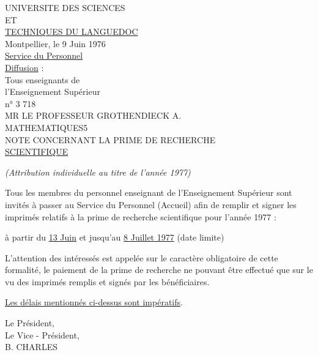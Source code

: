 UNIVERSITE DES SCIENCES\\
ET\\
\uline{TECHNIQUES DU LANGUEDOC}\\

Montpellier, le 9 Juin 1976\\

\uline{Service du Personnel}\\
\uline{Diffusion} :\\
Tous enseignants de\\
l'Enseignement Supérieur\\
n° 3 718\\

MR LE PROFESSEUR GROTHENDIECK A.\\
MATHEMATIQUES\hfill 5\\

NOTE CONCERNANT LA PRIME DE RECHERCHE\\
\uline{SCIENTIFIQUE}

\textit{(Attribution individuelle au titre de l'année 1977)}

Tous les membres du personnel enseignant de l'Enseignement Supérieur sont invités à passer au Service du Personnel (Accueil) afin de remplir et signer les imprimés relatifs à la prime de recherche scientifique pour l'année 1977 :

à partir du \uline{13 Juin} et jusqu'au \uline{8 Juillet 1977} (date limite)

L'attention des intéressés est appelée sur le caractère obligatoire de cette formalité, le paiement de la prime de recherche ne pouvant être effectué que sur le vu des imprimés remplis et signés par les bénéficiaires.

\uline{Les délais mentionnés ci-dessus sont impératifs}.

Le Président,\\
Le Vice - Président,\\

B. CHARLES\\
